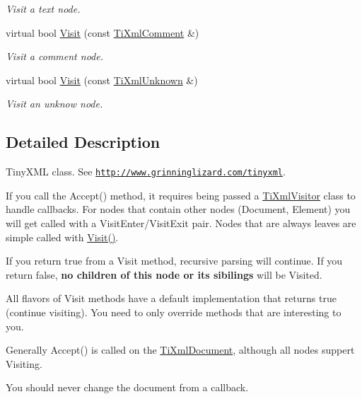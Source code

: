 \begin{DoxyCompactItemize}
\begin{DoxyCompactList}\small\item\em Visit a text node. \end{DoxyCompactList}\item 
virtual bool \hyperlink{class_ti_xml_visitor_a53a60e7a528627b31af3161972cc7fa2}{Visit} (const \hyperlink{class_ti_xml_comment}{Ti\+Xml\+Comment} \&)
\begin{DoxyCompactList}\small\item\em Visit a comment node. \end{DoxyCompactList}\item 
virtual bool \hyperlink{class_ti_xml_visitor_a7e284d607d275c51dac1adb58159ce28}{Visit} (const \hyperlink{class_ti_xml_unknown}{Ti\+Xml\+Unknown} \&)
\begin{DoxyCompactList}\small\item\em Visit an unknow node. \end{DoxyCompactList}\end{DoxyCompactItemize}


\subsection{Detailed Description}
Tiny\+X\+ML class. See \href{http://www.grinninglizard.com/tinyxml}{\tt http\+://www.\+grinninglizard.\+com/tinyxml}. 

If you call the Accept() method, it requires being passed a \hyperlink{class_ti_xml_visitor}{Ti\+Xml\+Visitor} class to handle callbacks. For nodes that contain other nodes (Document, Element) you will get called with a Visit\+Enter/\+Visit\+Exit pair. Nodes that are always leaves are simple called with \hyperlink{class_ti_xml_visitor_afad71c71ce6473fb9b4b64cd92de4a19}{Visit()}.

If you return \textquotesingle{}true\textquotesingle{} from a Visit method, recursive parsing will continue. If you return false, {\bfseries no children of this node or its sibilings} will be Visited.

All flavors of Visit methods have a default implementation that returns \textquotesingle{}true\textquotesingle{} (continue visiting). You need to only override methods that are interesting to you.

Generally Accept() is called on the \hyperlink{class_ti_xml_document}{Ti\+Xml\+Document}, although all nodes suppert Visiting.

You should never change the document from a callback.

